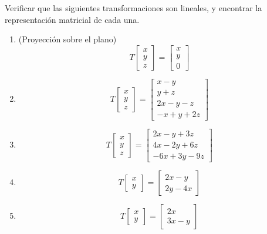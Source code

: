 \begin{problema} \label{exe:trans}Verificar que las siguientes transformaciones son lineales, y encontrar la representaci\'on
matricial de cada una.
\begin{enumerate}
 \item (Proyecci\'on sobre el plano)$$
T\begin{bmatrix}
  x \\ y \\z
 \end{bmatrix}
=\begin{bmatrix}
  x \\ y \\0
 \end{bmatrix}
 $$

 \item $$
T\begin{bmatrix}
  x \\ y \\z 
 \end{bmatrix}
 =\begin{bmatrix}
  x - y\\ y+z \\ 2x - y - z \\ -x+y+2z
 \end{bmatrix}
 $$

 \item $$
T\begin{bmatrix}
  x \\ y \\z
 \end{bmatrix}
 =\begin{bmatrix}
  2x - y +3z\\ 4x-2y+6z \\ -6x +3 y - 9z
 \end{bmatrix}
 $$

\item$$
T\begin{bmatrix}
  x \\ y 
 \end{bmatrix}
 =\begin{bmatrix}
   2x-y\\ 2y-4x
  \end{bmatrix}
$$

\item$$
T\begin{bmatrix}
  x \\ y 
 \end{bmatrix}
 =\begin{bmatrix}
   2x \\ 3x-y
  \end{bmatrix}
$$


\end{enumerate}
\end{problema}
